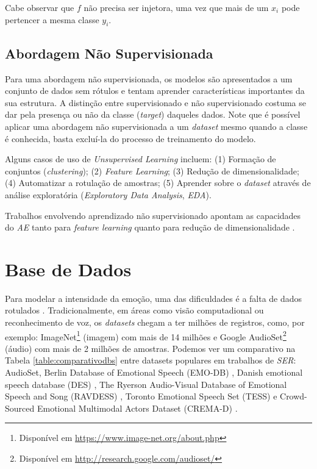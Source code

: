 Cabe observar que $f$ não precisa ser injetora, uma vez que mais de um $x_i$ pode pertencer a mesma classe $y_i$.

\subsection{Abordagem Não Supervisionada}

Para uma abordagem não supervisionada, os modelos são apresentados a um conjunto de dados sem rótulos e tentam aprender características importantes da sua estrutura. A distinção entre supervisionado e não supervisionado costuma se dar pela presença ou não da classe (\textit{target}) daqueles dados. Note que é possível aplicar uma abordagem não supervisionada a um \textit{dataset} mesmo quando a classe é conhecida, basta excluí-la do processo de treinamento do modelo.

Alguns casos de uso de \textit{Unsupervised Learning} incluem: (1) Formação de conjuntos (\textit{clustering}); (2) \textit{Feature Learning}; (3) Redução de dimensionalidade; (4) Automatizar a rotulação de amostras; (5) Aprender sobre o \textit{dataset} através de análise exploratória (\textit{Exploratory Data Analysis}, \textit{EDA}).

Trabalhos envolvendo aprendizado não supervisionado apontam as capacidades do \textit{AE} tanto para \textit{feature learning} \cite{35.16} \cite{35.17} quanto para redução de dimensionalidade \cite{35.18} \cite{35.19}.

\section{Base de Dados}\label{section:basesdedados}

Para modelar a intensidade da emoção, uma das dificuldades é a falta de dados rotulados \cite{18}. Tradicionalmente, em áreas como visão computadional ou reconhecimento de voz, os \textit{datasets} chegam a ter milhões de registros, como, por exemplo: ImageNet\footnote{Disponível em \url{https://www.image-net.org/about.php}} (imagem) com  mais de 14 milhões e Google AudioSet\footnote{Disponível em \url{http://research.google.com/audioset/}} (áudio) com mais de 2 milhões de amostras. Podemos ver um comparativo na Tabela \ref{table:comparativodbs} entre datasets populares \cite{32} em trabalhos de \textit{SER}: AudioSet, Berlin Database of Emotional Speech (EMO-DB) \cite{32.55}, Danish emotional speech database (DES) \cite{32.56}, The Ryerson Audio-Visual Database of Emotional Speech and Song (RAVDESS) \cite{32.57}, Toronto Emotional Speech Set (TESS) \cite{32.58} e Crowd-Sourced Emotional Multimodal Actors Dataset (CREMA-D) \cite{32.59}.

